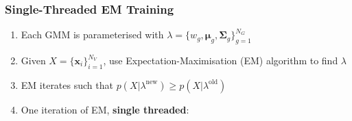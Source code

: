 \documentclass[usenames,dvipsnames]{beamer}
\def\Vec#1{{\boldsymbol{#1}}}
\def\Mat#1{{\boldsymbol{#1}}}
\begin{document}
\begin{frame}
\frametitle{Single-Threaded EM Training}

\begin{enumerate}[{~~$\boldsymbol{\bullet}$}]
\renewcommand{\itemsep}{1ex}

\item Each GMM is parameterised with $\lambda = \{ w_g, \Vec{\mu}_g, \Mat{\Sigma}_g \}_{g=1}^{N_G}$

\item Given $X=\{\Vec{x}_i\}_{i=1}^{N_V}$, use Expectation-Maximisation (EM) algorithm to find $\lambda$

\item EM iterates such that $p(X|\lambda^{\textrm{new}}) \geq p(X|\lambda^{\textrm{old}})$

\item One iteration of EM, {\bf single threaded}:

\begin{minipage}{1\textwidth}


\end{minipage}
\end{enumerate}
\end{frame}
\end{document}
